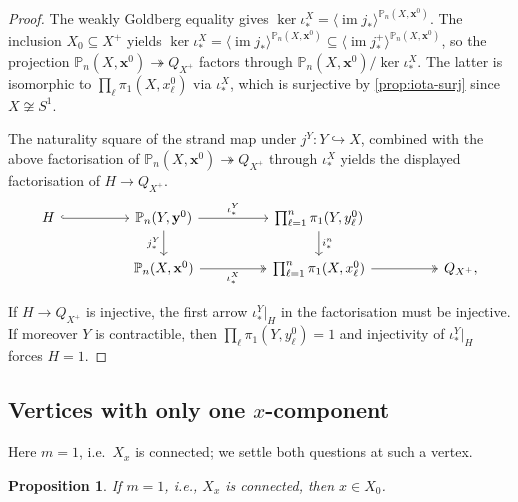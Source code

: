 \documentclass[reqno]{amsart}
\newtheorem{proposition}[theorem]{Proposition}
\theoremstyle{definition}
\newcommand\bfx{\mathbf{x}}
\newcommand\bfy{\mathbf{y}}
\newcommand{\PB}{\mathbb{P}}
\newcommand{\im}{\operatorname{im}}
\newcommand{\co}[1]{\mathopen{\langle}#1\mathclose{\rangle}} %
\newcommand{\base}{\bfx^0}
\numberwithin{equation}{section}
\begin{document}
\begin{proof}
The weakly Goldberg equality gives
\(\ker\iota_\ast^X = \langle\im j_\ast\rangle^{\PB_n(X,\base)}\). The inclusion \(X_0\subseteq X^+\)
yields \(\ker\iota_\ast^X=\langle \im j_\ast\rangle^{\PB_n(X,\base)} \subseteq \co{\im j^+_*}^{\PB_n(X,\base)}\),
so the projection \(\PB_n(X,\base)\twoheadrightarrow Q_{X^+}\) factors
through \(\PB_n(X,\base)/\ker\iota_\ast^X\). The latter is isomorphic to
\(\prod_\ell\pi_1(X,x_\ell^0)\) via \(\iota_\ast^X\), which is surjective
by \cref{prop:iota-surj} since \(X\not\cong S^1\).

The naturality square of the strand map under
\(j^Y\colon Y\hookrightarrow X\),
combined with the above factorisation of
\(\PB_n(X,\base)\twoheadrightarrow Q_{X^+}\) through \(\iota_\ast^X\) 
yields the displayed factorisation of \(H\to Q_{X^+}\).
\[
\begin{tikzcd}[column sep=huge]
H\ar[r,hookrightarrow] & \PB_n(Y,\bfy^0)
   \arrow[r, "\iota_\ast^Y"]
   \arrow[d, "j_\ast^Y"']
& \prod_{\ell=1}^{n}\pi_1(Y,y_\ell^0)
   \arrow[d, "i_\ast^n"] \\
&\PB_n(X,\base) \arrow[r, "\iota_\ast^X"', two heads]
& \prod_{\ell=1}^{n}\pi_1(X,x_\ell^0) \ar[r,two heads] & Q_{X^+},
\end{tikzcd}
\]

If \(H\to Q_{X^+}\) is injective, the first arrow \(\iota_\ast^Y|_H\) in
the factorisation must be injective. If moreover \(Y\) is contractible,
then \(\prod_\ell\pi_1(Y,y_\ell^0)=1\) and injectivity of
\(\iota_\ast^Y|_H\) forces \(H=1\).
\end{proof}


\subsection{Vertices with only one \(x\)-component}
Here \(m=1\), i.e.\ \(X_x\) is connected; we settle both questions
at such a vertex.

\begin{proposition}\label{prop:X0-contains-free-points}
If \(m=1\), i.e., \(X_x\) is connected, then \(x\in X_0\).
\end{proposition}
\end{document}
